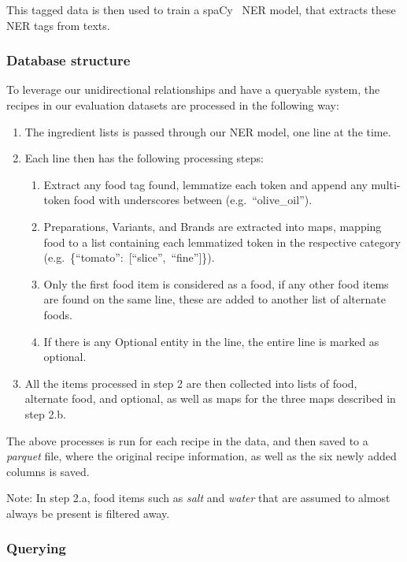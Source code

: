 \documentclass[11pt]{article}
\begin{document}
This tagged data is then used to train a spaCy~\cite{spacy} NER model, that
extracts these NER tags from texts.

\subsubsection{Database structure}
To leverage our unidirectional relationships and have a queryable system, the
recipes in our evaluation datasets are processed in the following way:
\begin{enumerate}
    \item The ingredient lists is passed through our NER model, one line at the
        time.
    \item Each line then has the following processing steps:
        \begin{enumerate}
            \item Extract any food tag found, lemmatize each token and append
                any multi-token food with underscores between (e.g.\
                ``olive\_oil'').
            \item Preparations, Variants, and Brands are extracted into maps,
                mapping food to a list containing each lemmatized token in the
                respective category \\(e.g.\ \{``tomato'':\ [``slice'',\
                ``fine'']\}).
            \item Only the first food item is considered as a food, if any other
                food items are found on the same line, these are added to
                another list of alternate foods.
            \item If there is any Optional entity in the line, the entire line
                is marked as optional.
        \end{enumerate}
    \item All the items processed in step 2 are then collected into lists of food, 
        alternate food, and optional, as well as maps for the three maps described in
        step 2.b.
\end{enumerate}
The above processes is run for each recipe in the data, and then saved to a
\emph{parquet} file, where the original recipe information, as well as the six newly
added columns is saved.

Note: In step 2.a, food items such as \emph{salt} and \emph{water} that are
assumed to almost always be present is filtered away.

\subsubsection{Querying}
\end{document}
